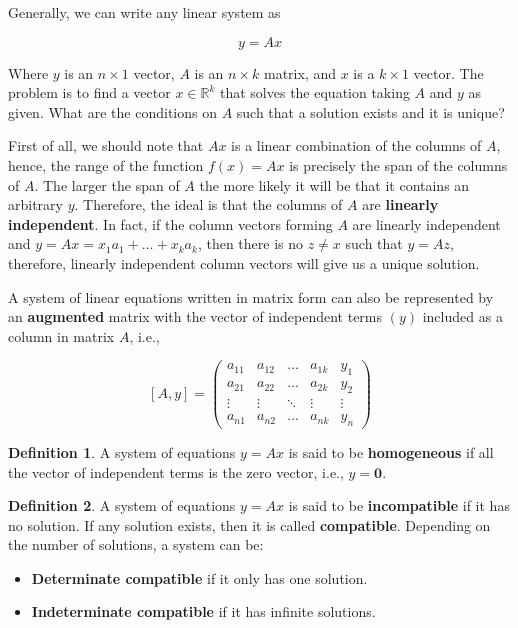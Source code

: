 \documentclass[a4paper,11pt]{article}
\theoremstyle{definition}
\newtheorem{definition}{Definition}
\theoremstyle{plain}
\begin{document}
Generally, we can write any linear system as

\[
y = Ax
\]

Where \(y\) is an \(n\times 1\) vector, \(A\) is an \(n\times k\)
matrix, and \(x\) is a \(k\times 1\) vector. The problem is to find a
vector \(x\in\mathbb{R}^k\) that solves the equation taking \(A\) and
\(y\) as given. What are the conditions on \(A\) such that a solution
exists and it is unique?

First of all, we should note that \(Ax\) is a linear combination of the
columns of \(A\), hence, the range of the function \(f(x) = Ax\) is
precisely the span of the columns of \(A\). The larger the span of \(A\)
the more likely it will be that it contains an arbitrary \(y\).
Therefore, the ideal is that the columns of \(A\) are \textbf{linearly
independent}. In fact, if the column vectors forming \(A\) are linearly
independent and \(y = Ax = x_1 a_1 + \ldots + x_k a_k\), then there is
no \(z\neq x\) such that \(y = Az\), therefore, linearly independent
column vectors will give us a unique solution.

A system of linear equations written in matrix form can also be
represented by an \textbf{augmented} matrix with the vector of
independent terms \((y)\) included as a column in matrix \(A\), i.e.,

\[
[A,y] = \left(\begin{array}{cccc|c}
a_{11} & a_{12} & \ldots & a_{1k} & y_1 \\ 
a_{21} & a_{22} & \ldots & a_{2k} & y_2 \\ 
\vdots & \vdots & \ddots & \vdots & \vdots \\ 
a_{n1} & a_{n2} & \ldots & a_{nk} & y_n 
\end{array}
\right)
\]

\begin{definition}
A system of equations \(y = Ax\) is said to be
\textbf{homogeneous} if all the vector of independent terms is the zero
vector, i.e., \(y = \mathbf{0}\).
\end{definition}

\begin{definition}
A system of equations \(y = Ax\) is said to be
\textbf{incompatible} if it has no solution. If any solution exists,
then it is called \textbf{compatible}. Depending on the number of
solutions, a system can be: 
\begin{itemize}
    \item \textbf{Determinate compatible} if it only has one solution. 
    \item \textbf{Indeterminate compatible} if it has infinite solutions.
\end{itemize}
\end{definition}
\end{document}
